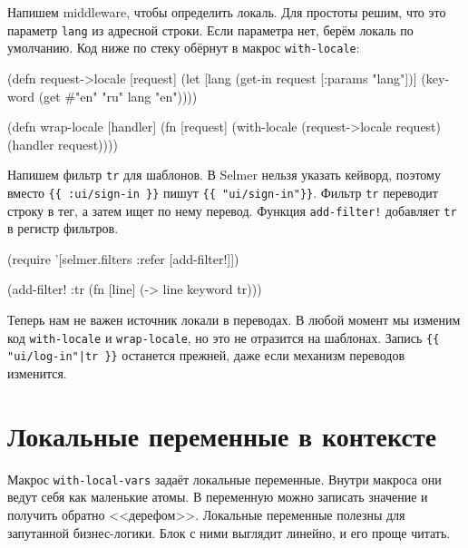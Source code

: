 
Напишем middleware, чтобы определить локаль. Для простоты решим, что это
параметр \verb|lang| из адресной строки. Если параметра нет, берём локаль по
умолчанию. Код ниже по стеку обёрнут в макрос \verb|with-locale|:

\begin{english}
  \begin{clojure}
(defn request->locale [request]
  (let [lang (get-in request [:params "lang"])]
    (keyword (get #{"en" "ru"} lang "en"))))

(defn wrap-locale [handler]
  (fn [request]
    (with-locale (request->locale request)
      (handler request))))
  \end{clojure}
\end{english}

Напишем фильтр \verb|tr| для шаблонов. В Selmer нельзя указать кейворд,
поэтому вместо \verb|{{ :ui/sign-in }}| пишут \verb|{{ "ui/sign-in"}}|.
Фильтр \verb|tr| переводит строку в тег, а затем ищет по нему
перевод. Функция \verb|add-filter!| добавляет \verb|tr| в регистр фильтров.

\begin{english}
  \begin{clojure}
(require '[selmer.filters :refer [add-filter!]])

(add-filter! :tr
 (fn [line]
   (-> line keyword tr)))
  \end{clojure}
\end{english}

Теперь нам не важен источник локали в переводах. В любой момент мы изменим код
\verb|with-locale| и \verb|wrap-locale|, но это не отразится на
шаблонах. Запись \verb={{ "ui/log-in"|tr }}= останется прежней, даже если
механизм переводов изменится.

\section{Локальные переменные в контексте}


Макрос \verb|with-local-vars| задаёт локальные переменные. Внутри макроса
они ведут себя как маленькие атомы. В переменную можно записать значение и
получить обратно <<дерефом>>. Локальные переменные полезны для запутанной
бизнес-логики. Блок с ними выглядит линейно, и его проще читать.

